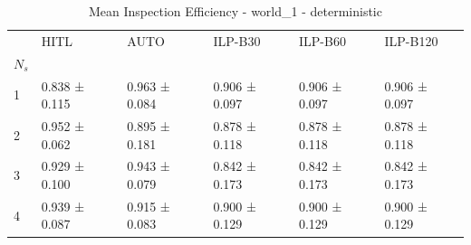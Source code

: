 \begin{table}
\caption{Mean Inspection Efficiency - world_1 - deterministic}
\label{tab:inspection_efficiency_deterministic}
\begin{tabular}{llllll}
\toprule
 & HITL & AUTO & ILP-B30 & ILP-B60 & ILP-B120 \\
$N_s$ &  &  &  &  &  \\
\midrule
1 & 0.838 ± 0.115 & 0.963 ± 0.084 & 0.906 ± 0.097 & 0.906 ± 0.097 & 0.906 ± 0.097 \\
2 & 0.952 ± 0.062 & 0.895 ± 0.181 & 0.878 ± 0.118 & 0.878 ± 0.118 & 0.878 ± 0.118 \\
3 & 0.929 ± 0.100 & 0.943 ± 0.079 & 0.842 ± 0.173 & 0.842 ± 0.173 & 0.842 ± 0.173 \\
4 & 0.939 ± 0.087 & 0.915 ± 0.083 & 0.900 ± 0.129 & 0.900 ± 0.129 & 0.900 ± 0.129 \\
\bottomrule
\end{tabular}
\end{table}

